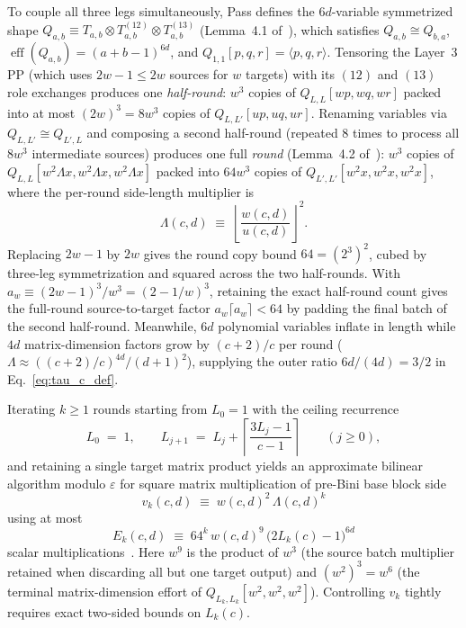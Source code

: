 \documentclass[11pt,a4paper]{article}
\theoremstyle{plain}
\theoremstyle{definition}
\theoremstyle{remark}
\DeclareMathOperator{\eff}{eff}
\begin{document}
To couple all three legs simultaneously, Pass defines the $6d$-variable symmetrized shape $Q_{a,b} \equiv T_{a,b} \otimes T_{a,b}^{(12)} \otimes T_{a,b}^{(13)}$ (Lemma~4.1 of~\cite{Pass2026}), which satisfies $Q_{a,b} \cong Q_{b,a}$, $\eff(Q_{a,b}) = (a + b - 1)^{6d}$, and $Q_{1,1}[p, q, r] = \langle p, q, r\rangle$. Tensoring the Layer~3 PP (which uses $2w - 1 \le 2w$ sources for $w$ targets) with its $(12)$ and $(13)$ role exchanges produces one \emph{half-round}: $w^3$ copies of $Q_{L, L}[wp, wq, wr]$ packed into at most $(2w)^3 = 8w^3$ copies of $Q_{L, L'}[up, uq, ur]$. Renaming variables via $Q_{L, L'} \cong Q_{L', L}$ and composing a second half-round (repeated $8$ times to process all $8w^3$ intermediate sources) produces one full \emph{round} (Lemma~4.2 of~\cite{Pass2026}): $w^3$ copies of $Q_{L, L}[w^2 \Lambda x, w^2 \Lambda x, w^2 \Lambda x]$ packed into $64 w^3$ copies of $Q_{L', L'}[w^2 x, w^2 x, w^2 x]$, where the per-round side-length multiplier is
\begin{equation}
    \Lambda(c, d) \;\equiv\; \left\lfloor \frac{w(c, d)}{u(c, d)} \right\rfloor^2 .
    \label{eq:lambda_def}
\end{equation}
Replacing $2w - 1$ by $2w$ gives the round copy bound $64 = (2^3)^2$, cubed by three-leg symmetrization and squared across the two half-rounds. With $a_w \equiv (2w - 1)^3 / w^3 = (2 - 1/w)^3$, retaining the exact half-round count gives the full-round source-to-target factor $a_w \lceil a_w \rceil < 64$ by padding the final batch of the second half-round. Meanwhile, $6d$ polynomial variables inflate in length while $4d$ matrix-dimension factors grow by $(c + 2)/c$ per round ($\Lambda \approx ((c + 2)/c)^{4d}/(d + 1)^2$), supplying the outer ratio $6d/(4d) = 3/2$ in Eq.~\eqref{eq:tau_c_def}.

Iterating $k \ge 1$ rounds starting from $L_0 = 1$ with the ceiling recurrence
\begin{equation}
    L_0 \;=\; 1, \qquad L_{j+1} \;=\; L_j + \left\lceil \frac{3 L_j - 1}{c - 1} \right\rceil \qquad (j \ge 0) ,
    \label{eq:Lk_recurrence}
\end{equation}
and retaining a single target matrix product yields an approximate bilinear algorithm modulo $\varepsilon$ for square matrix multiplication of pre-Bini base block side
\begin{equation}
    v_k(c, d) \;\equiv\; w(c, d)^2\,\Lambda(c, d)^k
    \label{eq:vk_def}
\end{equation}
using at most
\begin{equation}
    E_k(c, d) \;\equiv\; 64^k\,w(c, d)^9\,\bigl(2 L_k(c) - 1\bigr)^{6d}
    \label{eq:Ek_def}
\end{equation}
scalar multiplications~\cite[Proof of Theorem~4.3]{Pass2026}. Here $w^9$ is the product of $w^3$ (the source batch multiplier retained when discarding all but one target output) and $(w^2)^3 = w^6$ (the terminal matrix-dimension effort of $Q_{L_k, L_k}[w^2, w^2, w^2]$). Controlling $v_k$ tightly requires exact two-sided bounds on $L_k(c)$.
\end{document}
